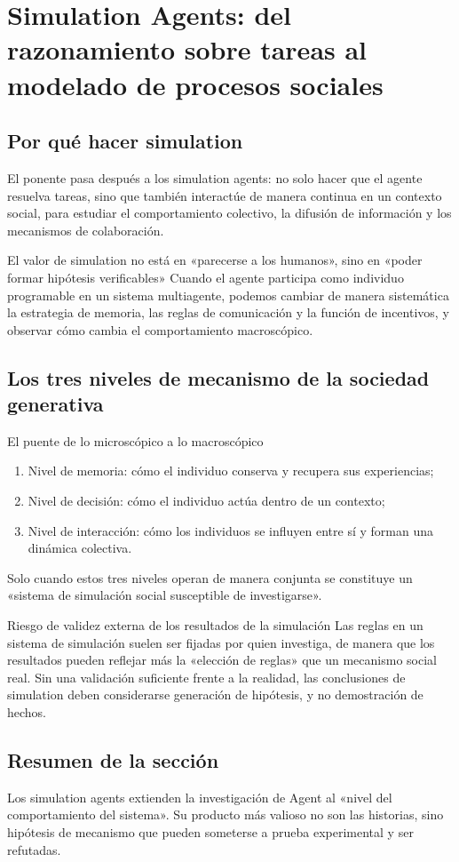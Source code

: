 \section{Simulation Agents: del razonamiento sobre tareas al modelado de procesos sociales}

\subsection{Por qué hacer simulation}
El ponente pasa después a los simulation agents: no solo hacer que el agente resuelva tareas, sino que también interactúe de manera continua en un contexto social, para estudiar el comportamiento colectivo, la difusión de información y los mecanismos de colaboración.

\begin{importantbox}{El valor de simulation no está en «parecerse a los humanos», sino en «poder formar hipótesis verificables»}
Cuando el agente participa como individuo programable en un sistema multiagente, podemos cambiar de manera sistemática la estrategia de memoria, las reglas de comunicación y la función de incentivos, y observar cómo cambia el comportamiento macroscópico.
\end{importantbox}

\subsection{Los tres niveles de mecanismo de la sociedad generativa}
\begin{knowledgebox}{El puente de lo microscópico a lo macroscópico}
\begin{enumerate}
    \item Nivel de memoria: cómo el individuo conserva y recupera sus experiencias;
    \item Nivel de decisión: cómo el individuo actúa dentro de un contexto;
    \item Nivel de interacción: cómo los individuos se influyen entre sí y forman una dinámica colectiva.
\end{enumerate}
Solo cuando estos tres niveles operan de manera conjunta se constituye un «sistema de simulación social susceptible de investigarse».
\end{knowledgebox}

\begin{warningbox}{Riesgo de validez externa de los resultados de la simulación}
Las reglas en un sistema de simulación suelen ser fijadas por quien investiga, de manera que los resultados pueden reflejar más la «elección de reglas» que un mecanismo social real.
Sin una validación suficiente frente a la realidad, las conclusiones de simulation deben considerarse generación de hipótesis, y no demostración de hechos.
\end{warningbox}

\subsection{Resumen de la sección}
Los simulation agents extienden la investigación de Agent al «nivel del comportamiento del sistema». Su producto más valioso no son las historias, sino hipótesis de mecanismo que pueden someterse a prueba experimental y ser refutadas.

